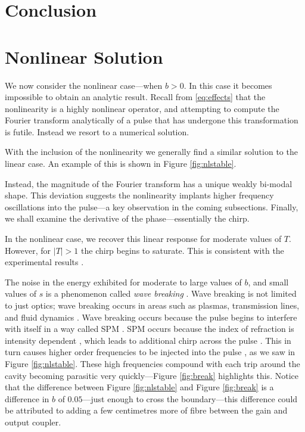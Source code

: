 \documentclass[10pt,twocolumn,a4paper]{article}
\begin{document}
\section{Conclusion}


\clearpage
\newpage




\section{Nonlinear Solution}
We now consider the nonlinear case---when $b > 0$. In this case it becomes impossible to obtain an analytic result. Recall from \eqref{eq:effects} that the nonlinearity is a highly nonlinear operator, and attempting to compute the Fourier transform analytically of a pulse that has undergone this transformation is futile. Instead we resort to a numerical solution.

With the inclusion of the nonlinearity we generally find a similar solution to the linear case. An example of this is shown in Figure \ref{fig:nlstable}.

Instead, the magnitude of the Fourier transform has a unique weakly bi-modal shape. This deviation suggests the nonlinearity implants higher frequency oscillations into the pulse---a key observation in the coming subsections. Finally, we shall examine the derivative of the phase---essentially the chirp.

 In the nonlinear case, we recover this linear response for moderate values of $T$. However, for $|T| > 1$ the chirp begins to saturate. This is consistent with the experimental results \cite{chen, rothenberg, tomlinson}.


The noise in the energy exhibited for moderate to large values of $b$, and small values of $s$ is a phenomenon called \emph{wave breaking} \cite{agrawal2013, anderson, finot, rothenberg, tomlinson}. Wave breaking is not limited to just optics; wave breaking occurs in areas such as plasmas, transmission lines, and fluid dynamics \cite{rothenberg}. Wave breaking occurs because the pulse begins to interfere with itself in a way called SPM \cite{agrawal2002, agrawal2013, becker}. SPM occurs because the index of refraction is intensity dependent \cite{agrawal2002, becker, rothenberg, silfvast}, which leads to additional chirp across the pulse \cite{agrawal2013, anderson, rothenberg, silfvast}. This in turn causes higher order frequencies to be injected into the pulse \cite{agrawal2013, anderson}, as we saw in Figure \ref{fig:nlstable}. These high frequencies compound with each trip around the cavity becoming parasitic very quickly---Figure \ref{fig:break} highlights this. Notice that the difference between Figure \ref{fig:nlstable} and Figure \ref{fig:break} is a difference in $b$ of $0.05$---just enough to cross the boundary---this difference could be attributed to adding a few centimetres more of fibre between the gain and output coupler. \\
\end{document}
